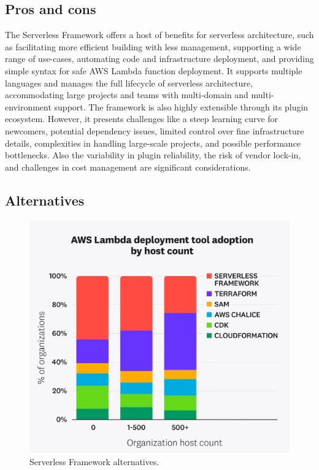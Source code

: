 \subsection{Pros and cons}
The Serverless Framework offers a host of benefits for serverless architecture, such as facilitating
more efficient building with less management, supporting a wide range of use-cases, automating code
and infrastructure deployment, and providing simple syntax for safe AWS Lambda function deployment.
It supports multiple languages and manages the full lifecycle of serverless architecture,
accommodating large projects and teams with multi-domain and multi-environment support. The
framework is also highly extensible through its plugin ecosystem. However, it presents challenges
like a steep learning curve for newcomers, potential dependency issues, limited control over fine
infrastructure details, complexities in handling large-scale projects, and possible performance
bottlenecks. Also the variability in plugin reliability, the risk of vendor lock-in, and
challenges in cost management are significant considerations.

\subsection{Alternatives}

\begin{figure}
    \centering
    \includegraphics[scale=0.5]{Pictures/3_serverless_framework.png}
    \caption{Serverless Framework alternatives.}
    \label{fig:3_serverless_alternatives}
\end{figure}

